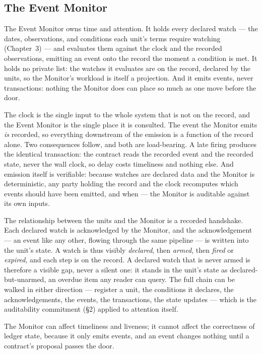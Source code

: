 \subsection{The Event Monitor}

The Event Monitor owns time and attention. It holds every declared watch ---
the dates, observations, and conditions each unit's terms require watching
(Chapter~3) --- and evaluates them against the clock and the recorded
observations, emitting an event onto the record the moment a condition is met.
It holds no private list: the watches it evaluates are on the record, declared
by the units, so the Monitor's workload is itself a projection. And it emits
events, never transactions: nothing the Monitor does can place so much as one
move before the door.

The clock is the single input to the whole system that is not on the record,
and the Event Monitor is the single place it is consulted. The event the
Monitor emits \emph{is} recorded, so everything downstream of the emission is a
function of the record alone. Two consequences follow, and both are
load-bearing. A late firing produces the identical transaction: the contract
reads the recorded event and the recorded state, never the wall clock, so delay
costs timeliness and nothing else. And emission itself is verifiable: because
watches are declared data and the Monitor is deterministic, any party holding
the record and the clock recomputes which events should have been emitted, and
when --- the Monitor is auditable against its own inputs.

The relationship between the units and the Monitor is a recorded handshake.
Each declared watch is acknowledged by the Monitor, and the acknowledgement ---
an event like any other, flowing through the same pipeline --- is written into
the unit's state. A watch is thus visibly \emph{declared}, then \emph{armed},
then \emph{fired} or \emph{expired}, and each step is on the record. A declared
watch that is never armed is therefore a visible gap, never a silent one: it
stands in the unit's state as declared-but-unarmed, an overdue item any reader
can query. The full chain can be walked in either direction --- register a
unit, the conditions it declares, the acknowledgements, the events, the
transactions, the state updates --- which is the auditability commitment
(\S2) applied to attention itself.

The Monitor can affect timeliness and liveness; it cannot affect the
correctness of ledger state, because it only emits events, and an event changes
nothing until a contract's proposal passes the door.

